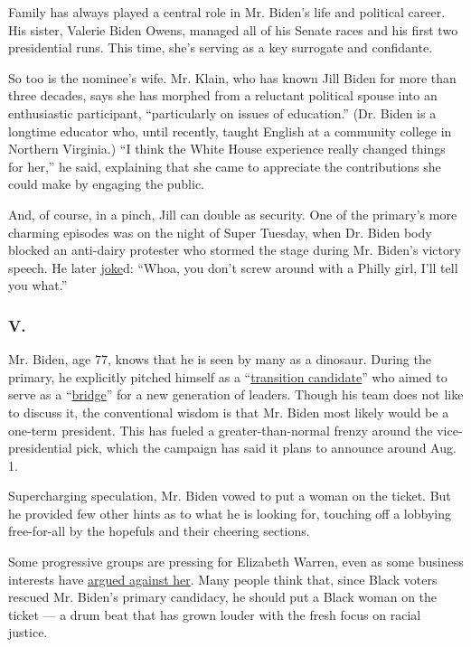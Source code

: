 Family has always played a central role in Mr. Biden's life and
political career. His sister, Valerie Biden Owens, managed all of his
Senate races and his first two presidential runs. This time, she's
serving as a key surrogate and confidante.

So too is the nominee's wife. Mr. Klain, who has known Jill Biden for
more than three decades, says she has morphed from a reluctant political
spouse into an enthusiastic participant, ``particularly on issues of
education.'' (Dr. Biden is a longtime educator who, until recently,
taught English at a community college in Northern Virginia.) ``I think
the White House experience really changed things for her,'' he said,
explaining that she came to appreciate the contributions she could make
by engaging the public.

And, of course, in a pinch, Jill can double as security. One of the
primary's more charming episodes was on the night of Super Tuesday, when
Dr. Biden body blocked an anti-dairy protester who stormed the stage
during Mr. Biden's victory speech. He later
\href{https://thehill.com/homenews/campaign/486064-biden-on-wife-blocking-protester-whoa-you-dont-screw-around-with-a-philly}{joke}d:
``Whoa, you don't screw around with a Philly girl, I'll tell you what.''

\hypertarget{v}{%
\subsubsection{V.}\label{v}}

Mr. Biden, age 77, knows that he is seen by many as a dinosaur. During
the primary, he explicitly pitched himself as a
``\href{https://www.nytimes3xbfgragh.onion/2020/05/03/us/politics/joe-biden-vice-president-pick.html}{transition
candidate}'' who aimed to serve as a
``\href{https://www.cnn.com/2020/03/09/politics/joe-biden-bridge-new-generation-of-leaders/index.html}{bridge}''
for a new generation of leaders. Though his team does not like to
discuss it, the conventional wisdom is that Mr. Biden most likely would
be a one-term president. This has fueled a greater-than-normal frenzy
around the vice-presidential pick, which the campaign has said it plans
to announce around Aug. 1.

Supercharging speculation, Mr. Biden vowed to put a woman on the ticket.
But he provided few other hints as to what he is looking for, touching
off a lobbying free-for-all by the hopefuls and their cheering sections.

Some progressive groups are pressing for Elizabeth Warren, even as some
business interests have
\href{https://www.cnbc.com/2020/04/30/donors-pressure-joe-biden-to-not-pick-elizabeth-warren-as-vp.html}{argued
against her}. Many people think that, since Black voters rescued Mr.
Biden's primary candidacy, he should put a Black woman on the ticket ---
a drum beat that has grown louder with the fresh focus on racial
justice.

